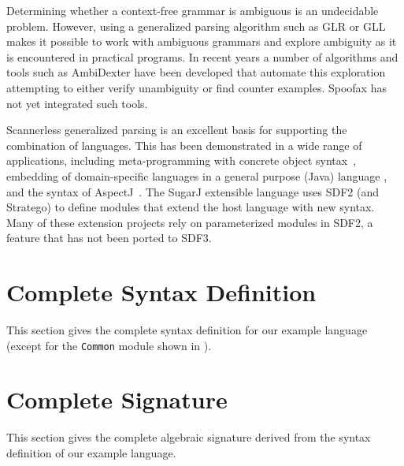Determining whether a context-free grammar is ambiguous is an undecidable
problem. However, using a generalized parsing algorithm such as GLR or GLL makes
it possible to work with ambiguous grammars and explore ambiguity as it is
encountered in practical programs. In recent years a number of algorithms and
tools such as AmbiDexter \cite{BastenS10} have been developed that automate this
exploration attempting to either verify unambiguity or find counter examples.
Spoofax has not yet integrated such tools. 

Scannerless generalized parsing is an excellent basis for supporting the
combination of languages. This has been demonstrated in a wide range of applications,
including meta-programming with concrete object syntax~\cite{Visser02},
embedding of domain-specific languages in a general purpose (Java) language
\cite{BravenboerV04}, and the syntax of AspectJ~\cite{BravenboerTV06}.
The SugarJ extensible language \cite{ErdwegRKO11} uses SDF2 (and Stratego) to
define modules that extend the host language with new syntax. 
Many of these extension projects rely on parameterized modules in SDF2, a
feature that has not been ported to SDF3.

\newpage
\section{Complete Syntax Definition}

This section gives the complete syntax definition for our example language
(except for the \texttt{Common} module shown in ).






\section{Complete Signature}

This section gives the complete algebraic signature derived from the syntax
definition of our example language.





